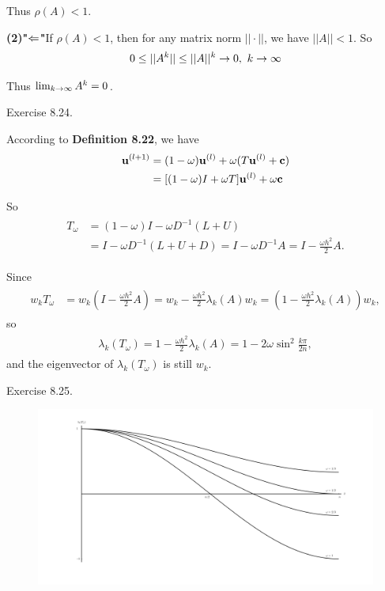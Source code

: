 \documentclass{homework}
\begin{document}
	Thus $\rho(A) < 1$.
	
	\textbf{(2)"$\Leftarrow$"}\quad If $\rho(A) < 1$, then for any matrix norm $||\cdot||$, we have $||A|| < 1$. So
	\begin{eqnarray}
		0 \leq ||A^k|| \leq ||A||^k \rightarrow 0,\ k \rightarrow \infty
	\end{eqnarray}
	
	Thus $\lim_{k\rightarrow\infty} A^k = 0$.
	
\question Exercise 8.24.

	According to \textbf{Definition 8.22}, we have
	\begin{eqnarray}
		\begin{aligned}
			\textbf{u}^{(l+1)} &= (1-\omega) \textbf{u}^{(l)} + \omega(T\textbf{u}^{(l)}+\textbf{c}) \\
			&= [(1-\omega)I + \omega T] \textbf{u}^{(l)} + \omega\textbf{c}
		\end{aligned}
	\end{eqnarray}
	
	So 
	\begin{eqnarray}
		\begin{aligned}
			T_\omega &= (1-\omega)I - \omega D^{-1}(L+U) \\
			&= I - \omega D^{-1} (L+U+D) = I - \omega D^{-1} A = I - \frac{\omega h^2}{2} A.
		\end{aligned}
	\end{eqnarray}
	
	Since 
	\begin{eqnarray}
		\begin{aligned}
			w_k T_\omega &= w_k (I - \frac{\omega h^2}{2} A)
			= w_k - \frac{\omega h^2}{2} \lambda_k(A) w_k
			= (1 - \frac{\omega h^2}{2}\lambda_k(A)) w_k, 
		\end{aligned}
	\end{eqnarray}
	so 
	\begin{eqnarray}
		\begin{aligned}
			\lambda_k(T_\omega) = 1 - \frac{\omega h^2}{2}\lambda_k(A) = 1 - 2\omega \sin^2 \frac{k\pi}{2n},
		\end{aligned}
	\end{eqnarray}
	and the eigenvector of $\lambda_k(T_\omega)$ is still $w_k$.
	
\question Exercise 8.25.
	\begin{figure}[H]\label{fig:25}
		\centering
		\includegraphics[width=\textwidth]{./media/Ex8_25.png}
	\end{figure}
	
	
\end{document}
